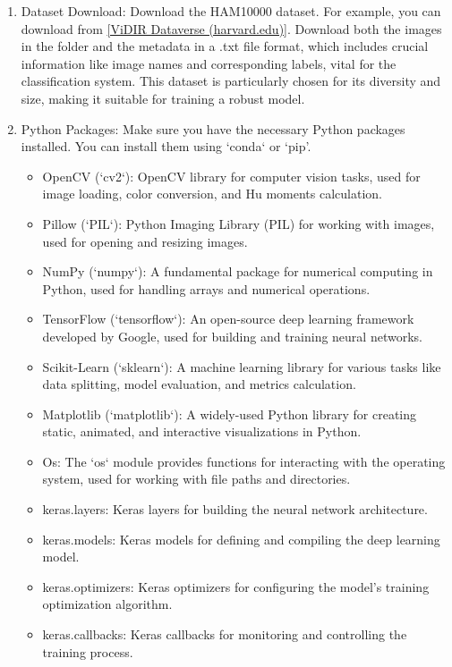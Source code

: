 \documentclass[10pt,twocolumn]{article}
\begin{document}
\begin{enumerate}
    \item Dataset Download:
\newline   
Download the HAM10000 dataset. For example, you can download from \href{https://dataverse.harvard.edu/dataset.xhtml?persistentId=doi:10.7910/DVN/DBW86T}{[ViDIR Dataverse (harvard.edu)]}. Download both the images in the folder and the metadata in a .txt file format, which includes crucial information like image names and corresponding labels, vital for the classification system. This dataset is particularly chosen for its diversity and size, making it suitable for training a robust model.
\newline
    \item Python Packages: Make sure you have the necessary Python packages installed. You can install them using `conda` or `pip'.
    \begin{itemize}
        \item OpenCV (`cv2`): OpenCV library for computer vision tasks, used for image loading, color conversion, and Hu moments calculation.
        \item Pillow (`PIL`): Python Imaging Library (PIL) for working with images, used for opening and resizing images.
        \item NumPy (`numpy`): A fundamental package for numerical computing in Python, used for handling arrays and numerical operations.
        \item TensorFlow (`tensorflow`): An open-source deep learning framework developed by Google, used for building and training neural networks.
        \item Scikit-Learn (`sklearn`): A machine learning library for various tasks like data splitting, model evaluation, and metrics calculation.
        \item Matplotlib (`matplotlib`): A widely-used Python library for creating static, animated, and interactive visualizations in Python.
        \item Os: The `os` module provides functions for interacting with the operating system, used for working with file paths and directories.
        \item keras.layers: Keras layers for building the neural network architecture.
        \item keras.models: Keras models for defining and compiling the deep learning model.
        \item keras.optimizers: Keras optimizers for configuring the model's training optimization algorithm.
        \item keras.callbacks: Keras callbacks for monitoring and controlling the training process.

\end{itemize}
\end{enumerate}
\end{document}
